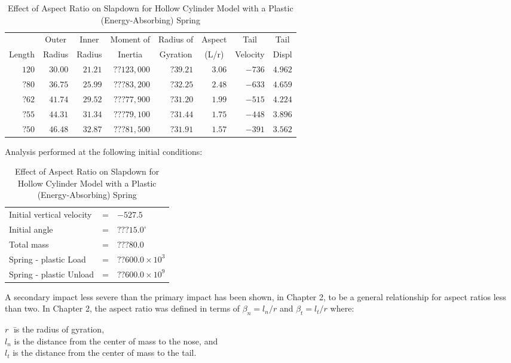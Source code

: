 \begin{table}
\begin{center}
\caption{Effect of Aspect Ratio on Slapdown for Hollow Cylinder Model 
with a Plastic (Energy-Absorbing) Spring}
\makeqnum
\begin{tabular}{||r|r|r|r|r|r|r|r||}
\hline
&\multicolumn{1}{c|}{Outer}  
&\multicolumn{1}{c|}{Inner}
&\multicolumn{1}{c|}{Moment of} 
&\multicolumn{1}{c|}{Radius of} 
&\multicolumn{1}{c|}{Aspect}
&\multicolumn{1}{c|}{Tail}
&\multicolumn{1}{c||}{Tail}\\
\multicolumn{1}{||c|}{Length} 
&\multicolumn{1}{c|}{Radius} 
&\multicolumn{1}{c|}{Radius} 
&\multicolumn{1}{c|}{Inertia} 
&\multicolumn{1}{c|}{Gyration} 
&\multicolumn{1}{c|}{(L/r)}
&\multicolumn{1}{c|}{Velocity} 
&\multicolumn{1}{c||}{Displ}\\
\hline
$120$ &$30.00$ &$21.21$ &$??123,000$ &$?39.21$ &$3.06$ &$-736$ 
&$4.962$\\
$?80$ &$36.75$ &$25.99$ &$???83,200$ &$?32.25$ &$2.48$ &$-633$
&$4.659$\\
$?62$ &$41.74$ &$29.52$ &$???77,900$ &$?31.20$ &$1.99$ &$-515$ 
&$4.224$\\
$?55$ &$44.31$ &$31.34$ &$???79,100$ &$?31.44$ &$1.75$ &$-448$
&$3.896$\\
$?50$ &$46.48$ &$32.87$ &$???81,500$ &$?31.91$ &$1.57$ &$-391$ 
&$3.562$\\
\hline
\end{tabular}
\end{center}

Analysis performed at the following initial conditions:

\makeqnum
\begin{tabular}{lll}
Initial vertical velocity &=  &$-527.5$\\
Initial angle             &=  &$???15.0^\circ$\\
Total mass                &=  &$???80.0$\\
Spring - plastic     Load &=  &$??600.0\times10^3$\\
Spring - plastic   Unload &=  &$??600.0\times10^9$\\
\end{tabular}
\end{table}

     A secondary impact less severe than the primary impact has been
shown, in Chapter 2, 
to be a general relationship for aspect ratios less than two.  In 
Chapter 2, the aspect ratio was defined in terms of $\beta_{n} = 
l_{n}/r$ and $\beta_{t} = l_{t}/r$ where:
\begin{tabbing}
$r  \;$ \= is the radius of gyration,\\
$l_{n}$ \> is the distance from the center of mass to the nose, and\\
$l_{t}$ \> is the distance from the center of mass to the tail.\\
\end{tabbing}

